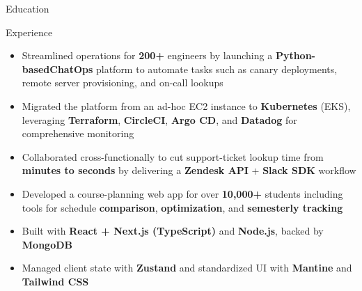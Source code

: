 \documentclass{resume}
\begin{document}
\introduction[
    fullname={Declan Blanchard},
    email={declanblanc@gmail.com},
    linkedin={linkedin.com/in/declanblanc},
    github={github.com/declanblanc}
]

\begin{educationSection}{Education}
    \educationItem[
        university={New Jersey Institute of Technology},
        graduation={May 2026},
        grade={\textbf{3.8 GPA}},
        program={Bachelor's, Computer Science}
    ]
\end{educationSection}

\begin{experienceSection}{Experience}


    \experienceItem[
        company={Patreon},
        location={New York, NY},
        position={Software Engineer Intern},
        duration={May 2025 - August 2025}
    ]
    \begin{itemize}[itemsep=-6pt, leftmargin=2em, rightmargin=0.8em, before=\raggedright, after=\normalfont]
        \item Streamlined operations for \textbf{200+} engineers by launching a \textbf{Python-basedChatOps} platform to automate tasks such as canary deployments, remote server provisioning, and on-call lookups
       \item Migrated the platform from an ad-hoc EC2 instance to \textbf{Kubernetes} (EKS), leveraging \textbf{Terraform}, \textbf{CircleCI}, \textbf{Argo CD}, and \textbf{Datadog} for comprehensive monitoring 
        \item Collaborated cross-functionally to cut support-ticket lookup time from \textbf{minutes to seconds} by delivering a \textbf{Zendesk API} + \textbf{Slack SDK} workflow
    \end{itemize}

    \experienceItem[
        company={New Jersey Institute of Technology},
        location={Newark, NJ},
        position={Full Stack Developer},
        duration={January 2025 - Present}
    ]
    \begin{itemize}[itemsep=-6pt, leftmargin=2em, rightmargin=0.8em, before=\raggedright, after=\normalfont]
        \item Developed a course-planning web app for over \textbf{10,000+} students including tools for schedule \textbf{comparison}, \textbf{optimization}, and \textbf{semesterly tracking} 
        \item Built with \textbf{React + Next.js (TypeScript)} and \textbf{Node.js}, backed by \textbf{MongoDB}
        \item Managed client state with \textbf{Zustand} and standardized UI with \textbf{Mantine} and \textbf{Tailwind CSS}
    \end{itemize}



\end{experienceSection}
\end{document}
